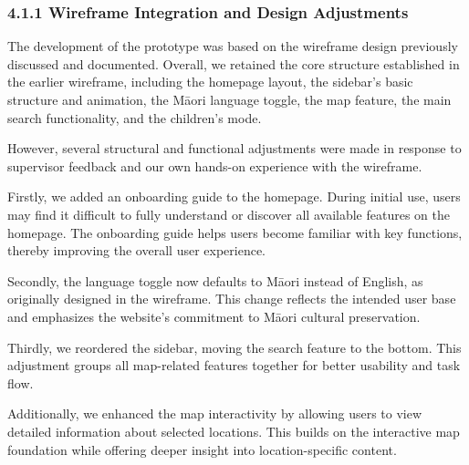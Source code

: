 ﻿%



\subsubsection*{4.1.1 Wireframe Integration and Design Adjustments}

The development of the prototype was based on the wireframe design previously discussed and documented. Overall, we retained the core structure established in the earlier wireframe, including the homepage layout, the sidebar’s basic structure and animation, the Māori language toggle, the map feature, the main search functionality, and the children’s mode.

However, several structural and functional adjustments were made in response to supervisor feedback and our own hands-on experience with the wireframe.

Firstly, we added an onboarding guide to the homepage. During initial use, users may find it difficult to fully understand or discover all available features on the homepage. The onboarding guide helps users become familiar with key functions, thereby improving the overall user experience.

Secondly, the language toggle now defaults to Māori instead of English, as originally designed in the wireframe. This change reflects the intended user base and emphasizes the website’s commitment to Māori cultural preservation.

Thirdly, we reordered the sidebar, moving the search feature to the bottom. This adjustment groups all map-related features together for better usability and task flow.

Additionally, we enhanced the map interactivity by allowing users to view detailed information about selected locations. This builds on the interactive map foundation while offering deeper insight into location-specific content.

